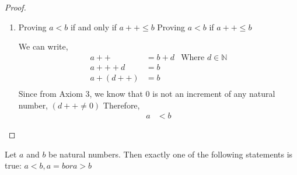 \documentclass[11pt]{report}
\begin{document}
\begin{proof}
\begin{enumerate}
		\item Proving $a < b$ if and only if $a++ \leq b$
		      Proving $a < b$ if $a++ \leq b$

		      We can write,
		      \begin{align*}
			      a++       & = b + d & \text{Where $d \in \mathbb{N}$} \\
			      a++ + d   & = b                                       \\
			      a + (d++) & = b                                       \\
		      \end{align*}
		      Since from Axiom 3, we know that 0 is not an increment of any natural number, $(d++ \neq 0)$
		      Therefore,
		      \begin{align*}
			      a & < b
		      \end{align*}

	\end{enumerate}
\end{proof}
\begin{prop}
	Let $a$ and $b$ be natural numbers. Then exactly one of the following statements is true: $a<b, a=b or a>b$
\end{prop}
\end{document}

